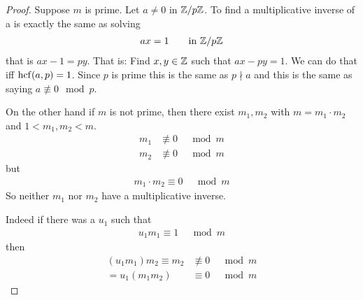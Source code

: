 \begin{proof}
	Suppose $m$ is prime. Let $a \neq 0$ in $\mathbb Z/p\mathbb Z$. To find a multiplicative inverse of a is exactly the same as solving 
	\begin{align*}
	ax = 1 \qquad \text{in} ~\mathbb Z/p\mathbb Z
	\end{align*}
	that is $ax-1 = py$. That is: Find $x,y \in \mathbb Z$ such that $ax - py =1$.
	We can do that iff $\operatorname{hcf}(a,p)=1$. Since $p$ is prime this is the same as $p \nmid a$ and this is the same as saying $a \not\equiv 0 \mod p$.
	
	On the other hand if $m$ is not prime, then there exist $m_1, m_2$ with $m = m_1 \cdot m_2$ and $1 < m_1, m_2 <m$.
	\begin{align*}
	m_1 & \not\equiv 0 & \mod m \\
	m_2 & \not\equiv 0 & \mod m 
	\end{align*}
	but
	\begin{align*}
	m_1 \cdot m_2 \equiv 0 & \mod m
	\end{align*}
	So neither $m_1$ nor $m_2$ have a multiplicative inverse.
	
	Indeed if there was a $u_1$ such that
	\begin{align*}
	u_1 m_1 \equiv 1 & \mod m
	\end{align*}
	then 
	\begin{align*}
	(u_1 m_1) m_2 \equiv m_2 & \not\equiv 0 & \mod m \\
	= u_1 (m_1m_2) & \equiv 0 & \mod m
	\end{align*}
\end{proof}

